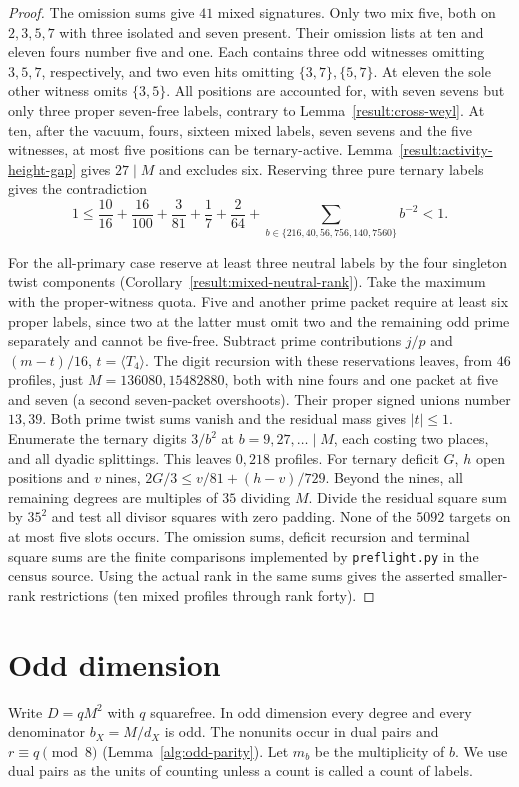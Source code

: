 \documentclass[11pt]{amsart}
\numberwithin{equation}{section}
\theoremstyle{definition}
\theoremstyle{plain}
\begin{document}
\begin{proof}
The omission sums give $41$ mixed signatures. Only two mix five, both
on $2,3,5,7$ with three isolated and seven present. Their omission
lists at ten and eleven fours number five and one. Each contains three
odd witnesses omitting $3,5,7$, respectively, and two even hits
omitting $\{3,7\},\{5,7\}$. At eleven the sole other witness omits
$\{3,5\}$. All positions are accounted for, with seven sevens but only
three proper seven-free labels, contrary to Lemma~\ref{result:cross-weyl}.
At ten, after the vacuum, fours, sixteen mixed labels, seven sevens and
the five witnesses, at most five positions can be ternary-active.
Lemma~\ref{result:activity-height-gap} gives $27\mid M$ and excludes
six. Reserving three pure ternary labels gives the contradiction
\[
 1\le\frac{10}{16}+\frac{16}{100}+\frac3{81}+\frac17+\frac2{64}
 +\sum_{b\in\{216,40,56,756,140,7560\}} b^{-2}<1.
\]

For the all-primary case reserve at least three neutral labels by the
four singleton twist components (Corollary~\ref{result:mixed-neutral-rank}).
Take the maximum with the proper-witness quota. Five and another prime
packet require at least six proper labels, since two at the latter
must omit two and the remaining odd prime separately and cannot be
five-free. Subtract prime contributions $j/p$ and $(m-t)/16$,
$t=\langle T_4\rangle$. The digit recursion with these reservations
leaves, from $46$ profiles, just $M=136080,15482880$, both with nine
fours and one packet at five and seven (a second seven-packet
overshoots). Their proper signed unions number $13,39$. Both prime
twist sums vanish and the residual mass gives $|t|\le1$. Enumerate
the ternary digits $3/b^2$ at $b=9,27,\ldots\mid M$, each costing
two places, and all dyadic splittings. This leaves $0,218$ profiles.
For ternary deficit $G$, $h$ open positions and $v$ nines,
$2G/3\le v/81+(h-v)/729$. Beyond the nines, all remaining degrees
are multiples of $35$ dividing $M$. Divide the residual square sum
by $35^2$ and test all divisor squares with zero padding. None of the
$5092$ targets on at most five slots occurs. The omission sums,
deficit recursion and terminal square sums are the finite comparisons
implemented by \texttt{preflight.py} in the census source.
Using the actual rank in the same sums gives the asserted smaller-rank
restrictions (ten mixed profiles through rank forty).
\end{proof}

\section{Odd dimension}\label{sec:odd-new}
Write $D=qM^2$ with $q$ squarefree. In odd dimension every degree and every
denominator $b_X=M/d_X$ is odd. The nonunits occur in dual pairs and
$r\equiv q\pmod8$ (Lemma~\ref{alg:odd-parity}). Let $m_b$ be the multiplicity of $b$.
We use dual pairs as the units of counting unless a count is called a count of labels.
\end{document}
